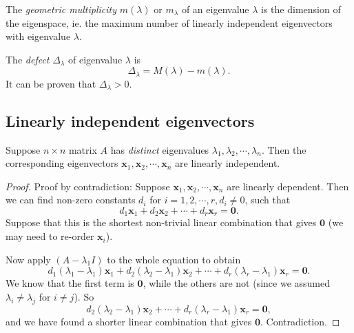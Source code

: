 \documentclass[a4paper]{article}
\begin{document}
\begin{defi}
  The \emph{geometric multiplicity} $m(\lambda)$ or $m_\lambda$ of an eigenvalue $\lambda$ is the dimension of the eigenspace, ie. the maximum number of linearly independent eigenvectors with eigenvalue $\lambda$.
\end{defi}

\begin{defi}
  The \emph{defect} $\Delta_\lambda$ of eigenvalue $\lambda$ is
  \[
    \Delta_\lambda = M(\lambda) - m(\lambda).
  \]
  It can be proven that $\Delta_\lambda > 0$.
\end{defi}

\subsection{Linearly independent eigenvectors}
\begin{thm}
  Suppose $n\times n$ matrix $A$ has \emph{distinct} eigenvalues $\lambda_1, \lambda_2, \cdots, \lambda_n$. Then the corresponding eigenvectors $\mathbf{x}_1, \mathbf{x}_2, \cdots, \mathbf{x}_n$ are linearly independent.
\end{thm}

\begin{proof}
  Proof by contradiction: Suppose $\mathbf{x}_1, \mathbf{x}_2, \cdots, \mathbf{x}_n$ are linearly dependent. Then we can find non-zero constants $d_i$ for $i = 1, 2, \cdots, r, d_i\not= 0$, such that
  \[
    d_1\mathbf{x}_1 + d_2\mathbf{x}_2 + \cdots + d_r\mathbf{x}_r = \mathbf{0}.
  \]
  Suppose that this is the shortest non-trivial linear combination that gives $\mathbf{0}$ (we may need to re-order $\mathbf{x}_i$).

  Now apply $(A - \lambda_1 I)$ to the whole equation to obtain
  \[
    d_1(\lambda_1 - \lambda_1)\mathbf{x}_1 + d_2(\lambda_2 - \lambda_1)\mathbf{x}_2 + \cdots + d_r(\lambda_r - \lambda_1)\mathbf{x}_r = \mathbf{0}.
  \]
  We know that the first term is $\mathbf{0}$, while the others are not (since we assumed $\lambda_i \not= \lambda_j$ for $i\not= j$). So
  \[
    d_2(\lambda_2 - \lambda_1)\mathbf{x}_2 + \cdots + d_r(\lambda_r - \lambda_1)\mathbf{x}_r = \mathbf{0},
  \]
  and we have found a shorter linear combination that gives $\mathbf{0}$. Contradiction.
\end{proof}
\end{document}
